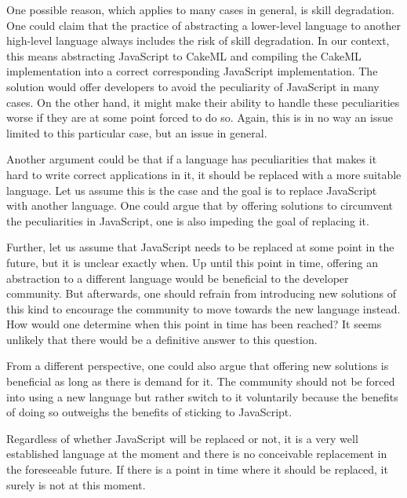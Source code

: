 \documentclass [11pt]{article}
\begin{document}
One possible reason, which applies to many cases in general, is skill degradation. One could claim that the practice of abstracting a lower-level language to another high-level language always includes the risk of skill degradation. In our context, this means abstracting JavaScript to CakeML and compiling the CakeML implementation into a correct corresponding JavaScript implementation. The solution would offer developers to avoid the peculiarity of JavaScript in many cases. On the other hand, it might make their ability to handle these peculiarities worse if they are at some point forced to do so. Again, this is in no way an issue limited to this particular case, but an issue in general.

Another argument could be that if a language has peculiarities that makes it hard to write correct applications in it, it should be replaced with a more suitable language. Let us assume this is the case and the goal is to replace JavaScript with another language. One could argue that by offering solutions to circumvent the peculiarities in JavaScript, one is also impeding the goal of replacing it.

Further, let us assume that JavaScript needs to be replaced at some point in the future, but it is unclear exactly when. Up until this point in time, offering an abstraction to a different language would be beneficial to the developer community. But afterwards, one should refrain from introducing new solutions of this kind to encourage the community to move towards the new language instead. How would one determine when this point in time has been reached? It seems unlikely that there would be a definitive answer to this question.

From a different perspective, one could also argue that offering new solutions is beneficial as long as there is demand for it. The community should not be forced into using a new language but rather switch to it voluntarily because the benefits of doing so outweighs the benefits of sticking to JavaScript.

Regardless of whether JavaScript will be replaced or not, it is a very well established language at the moment and there is no conceivable replacement in the foreseeable future. If there is a point in time where it should be replaced, it surely is not at this moment.
\end{document}
